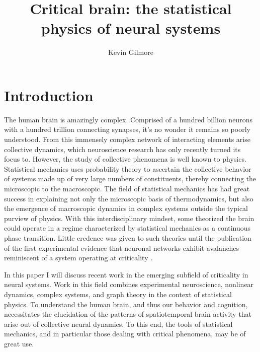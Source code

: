 \documentclass[12pt]{article}
\title{Critical brain: the statistical physics of neural systems}
\author
{Kevin Gilmore}
\newenvironment{sciabstract}{%
\begin{quote} \bf}
{\end{quote}}
\begin{document}
 


\baselineskip24pt


\maketitle 




\begin{sciabstract}

\end{sciabstract}


\section*{Introduction}

The human brain is amazingly complex. Comprised of a hundred billion neurons with a hundred trillion connecting synapses, it's no wonder it remains so poorly understood. From this immensely complex network of interacting elements arise collective dynamics, which neuroscience research has only recently turned its focus to. However, the study of collective phenomena is well known to physics. Statistical mechanics uses probability theory to ascertain the collective behavior of systems made up of very large numbers of constituents, thereby connecting the microscopic to the macroscopic. The field of statistical mechanics has had great success in explaining not only the microscopic basis of thermodynamics, but also the emergence of macroscopic dynamics in complex systems outside the typical purview of physics. With this interdisciplinary mindset, some theorized the brain could operate in a regime characterized by statistical mechanics as a continuous phase transition\cite{Bak1987a}. Little credence was given to such theories until the publication of the first experimental evidence that neuronal networks exhibit avalanches reminiscent of a system operating at criticality \cite{Beggs2003b}.

In this paper I will discuss recent work in the emerging subfield of criticality in neural systems. Work in this field combines experimental neuroscience, nonlinear dynamics, complex systems, and graph theory in the context of statistical physics. To understand the human brain, and thus our behavior and cognition, necessitates the elucidation of the patterns of spatiotemporal brain activity that arise out of collective neural dynamics. To this end, the tools of statistical mechanics, and in particular those dealing with critical phenomena, may be of great use.
\end{document}
